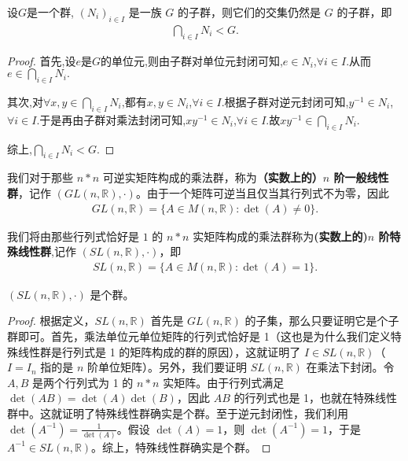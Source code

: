 \documentclass[../../main.tex]{subfiles}
\begin{document}
\begin{proposition}[子群的任意交仍是子群]\label{proposition:子群的任意交仍是子群}
设$G$是一个群, $(N_i)_{i\in I}$ 是一族 $G$ 的子群，则它们的交集仍然是 $G$ 的子群，即
\begin{align*}
\bigcap_{i\in I}N_i< G .
\end{align*}
\end{proposition}
\begin{proof}
首先,设$e$是$G$的单位元,则由子群对单位元封闭可知,$e\in N_i$,$\forall i\in I$.从而$e\in \bigcap_{i\in I}N_i.$

其次,对$\forall x,y\in \bigcap_{i\in I}N_i$,都有$x,y\in N_i$,$\forall i\in I$.根据子群对逆元封闭可知,$y^{-1}\in N_i$,$\forall i\in I$.于是再由子群对乘法封闭可知,$xy^{-1}\in N_i$,$\forall i\in I$.故$xy^{-1}\in \bigcap_{i\in I}N_i.$

综上,$\bigcap_{i\in I}N_i< G .$

\end{proof}

\begin{definition}[一般线性群]
我们对于那些 $n*n$ 可逆实矩阵构成的乘法群，称为\textbf{（实数上的）$n$ 阶一般线性群}，记作 $(GL(n, \mathbb{R}), \cdot)$。由于一个矩阵可逆当且仅当其行列式不为零，因此
\begin{align*}
GL(n, \mathbb{R}) = \{A \in M(n, \mathbb{R}) : \det(A) \neq 0\}.
\end{align*} 
\end{definition}

\begin{definition}[特殊线性群]
我们将由那些行列式恰好是 $1$ 的 $n*n$ 实矩阵构成的乘法群称为\textbf{(实数上的)$n$ 阶特殊线性群},记作 $(SL(n, \mathbb{R}), \cdot)$，即
\begin{align*}
SL(n, \mathbb{R}) = \{A \in M(n, \mathbb{R}) : \det(A) = 1\}.
\end{align*} 
\end{definition}

\begin{proposition}
$(SL(n, \mathbb{R}), \cdot)$ 是个群。
\end{proposition}
\begin{proof}
根据定义，$SL(n, \mathbb{R})$ 首先是 $GL(n, \mathbb{R})$ 的子集，那么只要证明它是个子群即可。首先，乘法单位元单位矩阵的行列式恰好是 1（这也是为什么我们定义特殊线性群是行列式是 1 的矩阵构成的群的原因），这就证明了 $I \in SL(n, \mathbb{R})$（$I = I_n$ 指的是 $n$ 阶单位矩阵）。另外，我们要证明 $SL(n, \mathbb{R})$ 在乘法下封闭。令 $A, B$ 是两个行列式为 1 的 $n*n$ 实矩阵。由于行列式满足 $\det(AB) = \det(A)\det(B)$，因此 $AB$ 的行列式也是 1，也就在特殊线性群中。这就证明了特殊线性群确实是个群。至于逆元封闭性，我们利用 $\det(A^{-1}) = \frac{1}{\det(A)}$。假设 $\det(A) = 1$，则 $\det(A^{-1}) = 1$，于是 $A^{-1} \in SL(n, \mathbb{R})$。综上，特殊线性群确实是个群。 

\end{proof}
\end{document}
